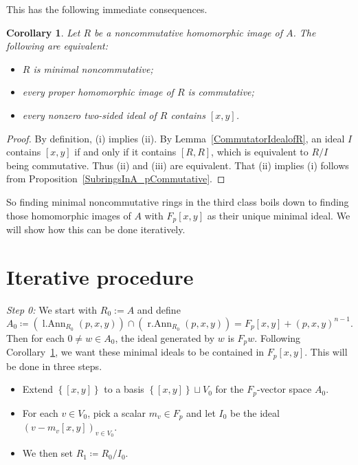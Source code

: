\documentclass[11pt]{article}
\DeclareMathOperator{\lAnn}{l.Ann}
\DeclareMathOperator{\rAnn}{r.Ann}
\newtheorem{corollary}{Corollary}[section]
\theoremstyle{definition}
\begin{document}
This has the following immediate consequences.

\begin{corollary}\label{OnlyHomoImages}
Let $R$ be a noncommutative homomorphic image of $A$. The following are equivalent:
\begin{itemize}[topsep=0pt]
\item[(i)] $R$ is minimal noncommutative;
\item[(ii)] every proper homomorphic image of $R$ is commutative;
\item[(iii)] every nonzero two-sided ideal of $R$ contains $[x,y]$.
\end{itemize}
\end{corollary}

\begin{proof}
By definition, (i) implies (ii). By Lemma~\ref{CommutatorIdealofR}, an ideal $I$ contains $[x,y]$ if and only if it contains $[R,R]$, which is equivalent to $R/I$ being commutative. Thus (ii) and (iii) are equivalent. That (ii) implies (i) follows from Proposition~\ref{SubringsInA_pCommutative}.
\end{proof}

So finding minimal noncommutative rings in the third class boils down to finding those homomorphic images of $A$ with $F_p[x,y]$ as their unique minimal ideal. We will show how this can be done iteratively.

\section{Iterative procedure}\label{IterativeProcedure}

\textit{Step 0:} We start with $R_0:=A$ and define
\[A_0\coloneqq\left(\lAnn_{R_0}(p,x,y)\right)\cap\left(\rAnn_{R_0}(p,x,y)\right)=F_p[x,y]+(p,x,y)^{n-1}.\]
Then for each $0\neq w\in A_0$, the ideal generated by $w$ is $F_p w$. Following Corollary~\ref{OnlyHomoImages}, we want these minimal ideals to be contained in $F_p[x,y]$. This will be done in three steps. 

\begin{itemize}[topsep=0pt]
\item[(a)] Extend $\left\lbrace[x,y]\right\rbrace$ to a basis $\left\lbrace[x,y]\right\rbrace\sqcup V_0$ for the $F_p$-vector space $A_0$.

\item[(b)] For each $v\in V_0$, pick a scalar $m_v\in F_p$ and let $I_0$ be the ideal $(v-m_v[x,y])_{v\in V_0}.$

\item[(c)] We then set $R_1\coloneqq R_0/I_0$.
\end{itemize}
\end{document}
